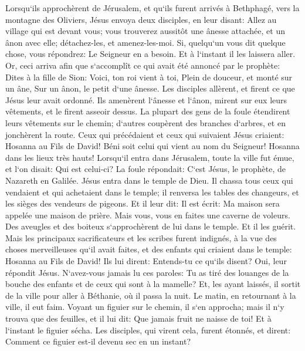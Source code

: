 \verse Lorsqu`ils approchèrent de Jérusalem, et qu`ils furent arrivés à Bethphagé, vers la montagne des Oliviers, Jésus envoya deux disciples, 
\verse en leur disant: Allez au village qui est devant vous; vous trouverez aussitôt une ânesse attachée, et un ânon avec elle; détachez-les, et amenez-les-moi. 
\verse Si, quelqu`un vous dit quelque chose, vous répondrez: Le Seigneur en a besoin. Et à l`instant il les laissera aller. 
\verse Or, ceci arriva afin que s`accomplît ce qui avait été annoncé par le prophète: 
\verse Dites à la fille de Sion: Voici, ton roi vient à toi, Plein de douceur, et monté sur un âne, Sur un ânon, le petit d`une ânesse. 
\verse Les disciples allèrent, et firent ce que Jésus leur avait ordonné. 
\verse Ils amenèrent l`ânesse et l`ânon, mirent sur eux leurs vêtements, et le firent asseoir dessus. 
\verse La plupart des gens de la foule étendirent leurs vêtements sur le chemin; d`autres coupèrent des branches d`arbres, et en jonchèrent la route. 
\verse Ceux qui précédaient et ceux qui suivaient Jésus criaient: Hosanna au Fils de David! Béni soit celui qui vient au nom du Seigneur! Hosanna dans les lieux très hauts! 
\verse Lorsqu`il entra dans Jérusalem, toute la ville fut émue, et l`on disait: Qui est celui-ci? 
\verse La foule répondait: C`est Jésus, le prophète, de Nazareth en Galilée. 
\verse Jésus entra dans le temple de Dieu. Il chassa tous ceux qui vendaient et qui achetaient dans le temple; il renversa les tables des changeurs, et les sièges des vendeurs de pigeons. 
\verse Et il leur dit: Il est écrit: Ma maison sera appelée une maison de prière. Mais vous, vous en faites une caverne de voleurs. 
\verse Des aveugles et des boiteux s`approchèrent de lui dans le temple. Et il les guérit. 
\verse Mais les principaux sacrificateurs et les scribes furent indignés, à la vue des choses merveilleuses qu`il avait faites, et des enfants qui criaient dans le temple: Hosanna au Fils de David! 
\verse Ils lui dirent: Entends-tu ce qu`ils disent? Oui, leur répondit Jésus. N`avez-vous jamais lu ces paroles: Tu as tiré des louanges de la bouche des enfants et de ceux qui sont à la mamelle? 
\verse Et, les ayant laissés, il sortit de la ville pour aller à Béthanie, où il passa la nuit. 
\verse Le matin, en retournant à la ville, il eut faim. 
\verse Voyant un figuier sur le chemin, il s`en approcha; mais il n`y trouva que des feuilles, et il lui dit: Que jamais fruit ne naisse de toi! Et à l`instant le figuier sécha. 
\verse Les disciples, qui virent cela, furent étonnés, et dirent: Comment ce figuier est-il devenu sec en un instant? 
